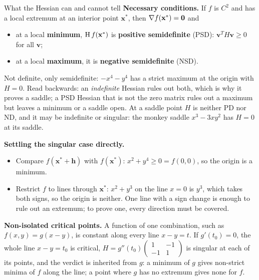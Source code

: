 \begin{rulebox}{What the Hessian can and cannot tell}
\textbf{Necessary conditions.} If $f$ is $C^{2}$ and has a local extremum
at an interior point $\mathbf{x}^{*}$, then $\nabla f(\mathbf{x}^{*})=\mathbf{0}$
and
\begin{itemize}[leftmargin=1.6em,itemsep=0.3ex]
  \item at a local \textbf{minimum}, $\operatorname{H} f(\mathbf{x}^{*})$ is
        \textbf{positive semidefinite} (PSD): $\mathbf{v}^{T}H\mathbf{v}\ge0$
        for all $\mathbf{v}$;
  \item at a local \textbf{maximum}, it is \textbf{negative semidefinite}
        (NSD).
\end{itemize}
Not definite, only semidefinite: $-x^{4}-y^{4}$ has a strict maximum at the
origin with $H=0$. Read backwards: an \emph{indefinite} Hessian rules out
both, which is why it proves a saddle; a PSD Hessian that is not the zero
matrix rules out a maximum but leaves a minimum or a saddle open. At a
saddle point $H$ is neither PD nor ND, and it may be indefinite or
singular: the monkey saddle $x^{3}-3xy^{2}$ has $H=0$ at its saddle.

\textbf{Settling the singular case directly.}
\begin{itemize}[leftmargin=1.6em,itemsep=0.3ex]
  \item Compare $f(\mathbf{x}^{*}+\mathbf{h})$ with $f(\mathbf{x}^{*})$:
        $x^{2}+y^{4}\ge0=f(0,0)$, so the origin is a minimum.
  \item Restrict $f$ to lines through $\mathbf{x}^{*}$: $x^{2}+y^{3}$ on the
        line $x=0$ is $y^{3}$, which takes both signs, so the origin is
        neither. One line with a sign change is enough to rule out an
        extremum; to prove one, every direction must be covered.
\end{itemize}
\textbf{Non-isolated critical points.} A function of one combination, such
as $f(x,y)=g(x-y)$, is constant along every line $x-y=t$. If $g'(t_{0})=0$,
the whole line $x-y=t_{0}$ is critical, $H=g''(t_{0})\begin{pmatrix}1&-1\\-1&1
\end{pmatrix}$ is singular at each of its points, and the verdict is
inherited from $g$: a minimum of $g$ gives non-strict minima of $f$ along
the line; a point where $g$ has no extremum gives none for $f$.
\end{rulebox}

